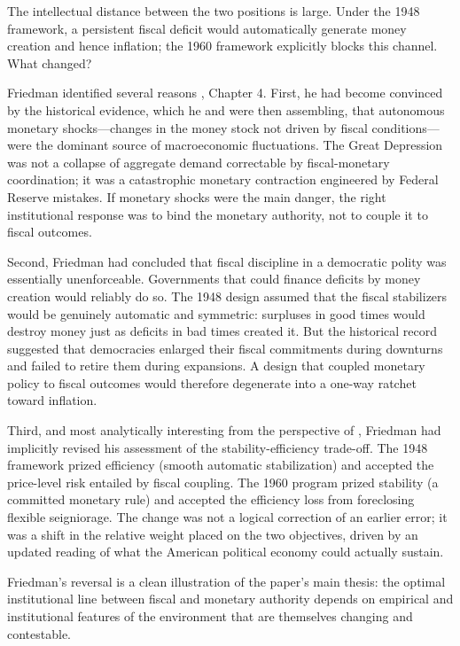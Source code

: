 \documentclass[12pt]{article}
\begin{document}
The intellectual distance between the two positions is large.  Under
the 1948 framework, a persistent fiscal deficit would automatically
generate money creation and hence inflation; the 1960 framework
explicitly blocks this channel.  What changed?

Friedman identified several reasons \citep{Friedman1960}, Chapter 4.
First, he had become convinced by the historical evidence, which he and
\citet{FriedmanSchwartz1963} were then assembling, that autonomous
monetary shocks---changes in the money stock not driven by fiscal
conditions---were the dominant source of macroeconomic fluctuations.
The Great Depression was not a collapse of aggregate demand correctable
by fiscal-monetary coordination; it was a catastrophic monetary
contraction engineered by Federal Reserve mistakes.  If monetary shocks
were the main danger, the right institutional response was to bind the
monetary authority, not to couple it to fiscal outcomes.

Second, Friedman had concluded that fiscal discipline in a democratic
polity was essentially unenforceable.  Governments that could finance
deficits by money creation would reliably do so.  The 1948 design assumed
that the fiscal stabilizers would be genuinely automatic and symmetric:
surpluses in good times would destroy money just as deficits in bad times
created it.  But the historical record suggested that democracies enlarged
their fiscal commitments during downturns and failed to retire them
during expansions.  A design that coupled monetary policy to fiscal
outcomes would therefore degenerate into a one-way ratchet toward
inflation.

Third, and most analytically interesting from the perspective of
\citet{Sargent2011}, Friedman had implicitly revised his assessment of
the stability-efficiency trade-off.  The 1948 framework prized efficiency
(smooth automatic stabilization) and accepted the price-level risk
entailed by fiscal coupling.  The 1960 program prized stability
(a committed monetary rule) and accepted the efficiency loss from
foreclosing flexible seigniorage.  The change was not a logical
correction of an earlier error; it was a shift in the relative weight
placed on the two objectives, driven by an updated reading of what
the American political economy could actually sustain.

Friedman's reversal is a clean illustration of the paper's main thesis:
the optimal institutional line between fiscal and monetary authority
depends on empirical and institutional features of the environment that
are themselves changing and contestable.
\end{document}
